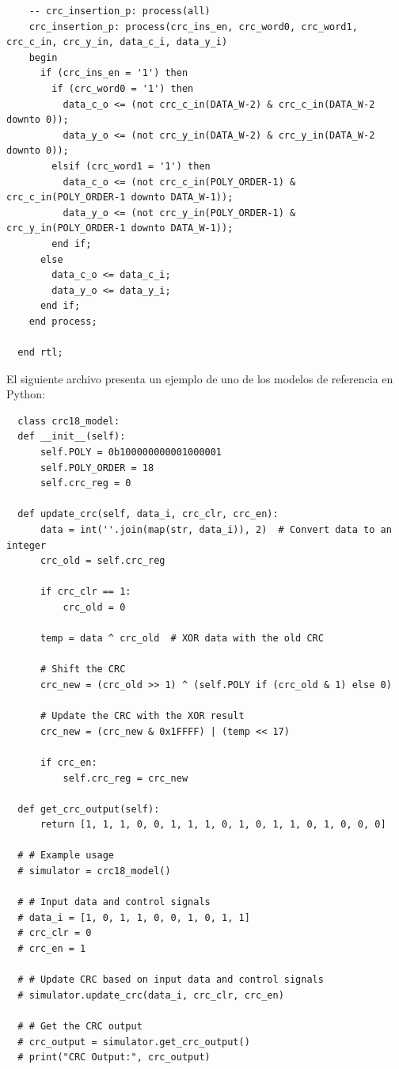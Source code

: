 {\begin{verbatim}
    -- crc_insertion_p: process(all)
    crc_insertion_p: process(crc_ins_en, crc_word0, crc_word1, crc_c_in, crc_y_in, data_c_i, data_y_i)
    begin
      if (crc_ins_en = '1') then
        if (crc_word0 = '1') then
          data_c_o <= (not crc_c_in(DATA_W-2) & crc_c_in(DATA_W-2 downto 0));
          data_y_o <= (not crc_y_in(DATA_W-2) & crc_y_in(DATA_W-2 downto 0));
        elsif (crc_word1 = '1') then
          data_c_o <= (not crc_c_in(POLY_ORDER-1) & crc_c_in(POLY_ORDER-1 downto DATA_W-1));
          data_y_o <= (not crc_y_in(POLY_ORDER-1) & crc_y_in(POLY_ORDER-1 downto DATA_W-1));
        end if;
      else
        data_c_o <= data_c_i;
        data_y_o <= data_y_i;
      end if;
    end process;

  end rtl;
\end{verbatim}}

El siguiente archivo presenta un ejemplo de uno de los modelos de referencia en Python:

{\scriptsize\begin{verbatim}
  class crc18_model:
  def __init__(self):
      self.POLY = 0b100000000001000001
      self.POLY_ORDER = 18
      self.crc_reg = 0

  def update_crc(self, data_i, crc_clr, crc_en):
      data = int(''.join(map(str, data_i)), 2)  # Convert data to an integer
      crc_old = self.crc_reg

      if crc_clr == 1:
          crc_old = 0

      temp = data ^ crc_old  # XOR data with the old CRC

      # Shift the CRC
      crc_new = (crc_old >> 1) ^ (self.POLY if (crc_old & 1) else 0)

      # Update the CRC with the XOR result
      crc_new = (crc_new & 0x1FFFF) | (temp << 17)

      if crc_en:
          self.crc_reg = crc_new

  def get_crc_output(self):
      return [1, 1, 1, 0, 0, 1, 1, 1, 0, 1, 0, 1, 1, 0, 1, 0, 0, 0]

  # # Example usage
  # simulator = crc18_model()

  # # Input data and control signals
  # data_i = [1, 0, 1, 1, 0, 0, 1, 0, 1, 1]
  # crc_clr = 0
  # crc_en = 1

  # # Update CRC based on input data and control signals
  # simulator.update_crc(data_i, crc_clr, crc_en)

  # # Get the CRC output
  # crc_output = simulator.get_crc_output()
  # print("CRC Output:", crc_output)
\end{verbatim}}

